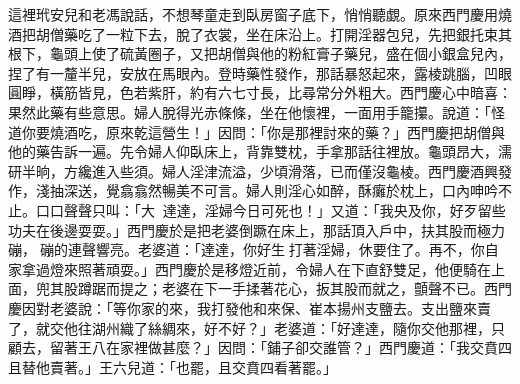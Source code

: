 這裡玳安兒和老馮說話，不想琴童走到臥房窗子底下，悄悄聽覷。原來西門慶用燒酒把胡僧藥吃了一粒下去，脫了衣裳，坐在床沿上。打開淫器包兒，先把銀托束其根下，龜頭上使了硫黃圈子，又把胡僧與他的粉紅膏子藥兒，盛在個小銀盒兒內，捏了有一釐半兒，安放在馬眼內。登時藥性發作，那話暴怒起來，露棱跳腦，凹眼圓睜，橫筋皆見，色若紫肝，約有六七寸長，比尋常分外粗大。西門慶心中暗喜：果然此藥有些意思。婦人脫得光赤條條，坐在他懷裡，一面用手籠攥。說道：「怪道你要燒酒吃，原來乾這營生！」因問：「你是那裡討來的藥？」西門慶把胡僧與他的藥告訴一遍。先令婦人仰臥床上，背靠雙枕，手拿那話往裡放。龜頭昂大，濡研半晌，方纔進入些須。婦人淫津流溢，少頃滑落，已而僅沒龜棱。西門慶酒興發作，淺抽深送，覺翕翕然暢美不可言。婦人則淫心如醉，酥癱於枕上，口內呻吟不止。口口聲聲只叫：「大𣬠𣬶達達，淫婦今日可死也！」又道：「我央及你，好歹留些功夫在後邊耍耍。」西門慶於是把老婆倒蹶在床上，那話頂入戶中，扶其股而極力𢵞磞，𢵞磞的連聲響亮。老婆道：「達達，你好生𢵞打著淫婦，休要住了。再不，你自家拿過燈來照著頑耍。」西門慶於是移燈近前，令婦人在下直舒雙足，他便騎在上面，兜其股蹲踞而提之；老婆在下一手揉著花心，扳其股而就之，顫聲不已。西門慶因對老婆說：「等你家的來，我打發他和來保、崔本揚州支鹽去。支出鹽來賣了，就交他往湖州織了絲綢來，好不好？」老婆道：「好達達，隨你交他那裡，只顧去，留著王八在家裡做甚麼？」因問：「鋪子卻交誰管？」西門慶道：「我交賁四且替他賣著。」王六兒道：「也罷，且交賁四看著罷。」

